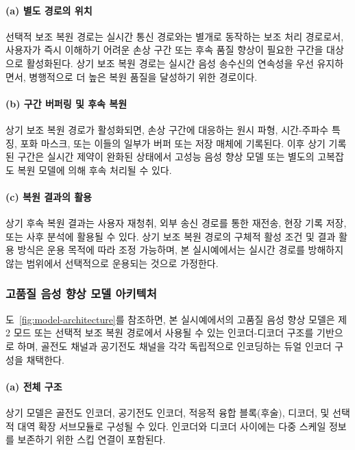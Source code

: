 \documentclass{article}
\begin{document}
\paragraph{(a) 별도 경로의 위치}

선택적 보조 복원 경로는 실시간 통신 경로와는 별개로 동작하는 보조 처리 경로로서, 사용자가 즉시 이해하기 어려운 손상 구간 또는 후속 품질 향상이 필요한 구간을 대상으로 활성화된다. 상기 보조 복원 경로는 실시간 음성 송수신의 연속성을 우선 유지하면서, 병행적으로 더 높은 복원 품질을 달성하기 위한 경로이다.

\paragraph{(b) 구간 버퍼링 및 후속 복원}

상기 보조 복원 경로가 활성화되면, 손상 구간에 대응하는 원시 파형, 시간-주파수 특징, 포화 마스크, 또는 이들의 일부가 버퍼 또는 저장 매체에 기록된다. 이후 상기 기록된 구간은 실시간 제약이 완화된 상태에서 고성능 음성 향상 모델 또는 별도의 고복잡도 복원 모델에 의해 후속 처리될 수 있다.

\paragraph{(c) 복원 결과의 활용}

상기 후속 복원 결과는 사용자 재청취, 외부 송신 경로를 통한 재전송, 현장 기록 저장, 또는 사후 분석에 활용될 수 있다. 상기 보조 복원 경로의 구체적 활성 조건 및 결과 활용 방식은 운용 목적에 따라 조정 가능하며, 본 실시예에서는 실시간 경로를 방해하지 않는 범위에서 선택적으로 운용되는 것으로 가정한다.

\subsubsection{고품질 음성 향상 모델 아키텍처}

도~\ref{fig:model-architecture}를 참조하면, 본 실시예에서의 고품질 음성 향상 모델은 제2 모드 또는 선택적 보조 복원 경로에서 사용될 수 있는 인코더-디코더 구조를 기반으로 하며, 골전도 채널과 공기전도 채널을 각각 독립적으로 인코딩하는 듀얼 인코더 구성을 채택한다.

\paragraph{(a) 전체 구조}

상기 모델은 골전도 인코더, 공기전도 인코더, 적응적 융합 블록(후술), 디코더, 및 선택적 대역 확장 서브모듈로 구성될 수 있다. 인코더와 디코더 사이에는 다중 스케일 정보를 보존하기 위한 스킵 연결이 포함된다.
\end{document}
